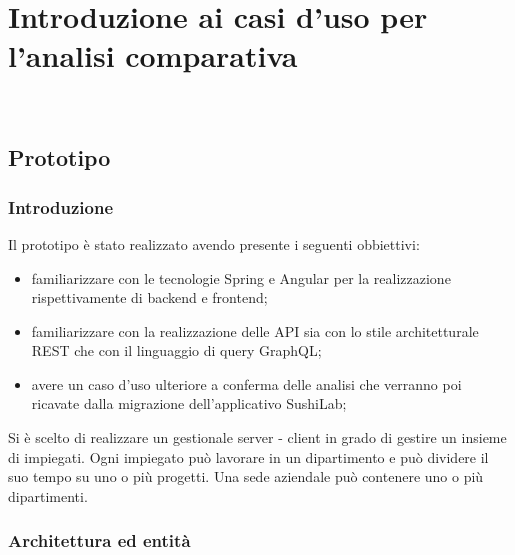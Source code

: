 
\chapter{Introduzione ai casi d'uso per l'analisi comparativa}
\label{casi-uso}

\\
\section{Prototipo}
\subsection{Introduzione}
Il prototipo è stato realizzato avendo presente i seguenti obbiettivi:
\begin{itemize}
  \item familiarizzare con le tecnologie Spring e Angular per la realizzazione rispettivamente di backend e frontend;
  \item familiarizzare con la realizzazione delle API sia con lo stile architetturale REST che con il linguaggio di query GraphQL;
  \item avere un caso d'uso ulteriore a conferma delle analisi che verranno poi ricavate dalla migrazione dell'applicativo SushiLab;
\end{itemize}
Si è scelto di realizzare un gestionale server - client in grado di gestire un insieme di impiegati. Ogni impiegato può lavorare in un dipartimento e può dividere il suo tempo su uno o più progetti. Una sede aziendale può contenere uno o più dipartimenti.
\subsection{Architettura ed entità}
